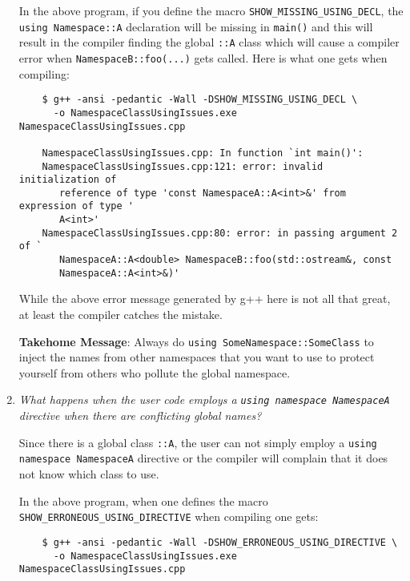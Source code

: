 \begin{enumerate}
In the above program, if you define the macro
{}\texttt{SHOW\-\_MISSING\-\_USING\-\_DECL}, the {}\texttt{using Namespace::A}
declaration will be missing in {}\texttt{main()} and this will result in the
compiler finding the global {}\texttt{::A} class which will cause a compiler
error when {}\texttt{NamespaceB::foo(...)} gets called.  Here is what one gets
when compiling:

{\small\begin{verbatim}
    $ g++ -ansi -pedantic -Wall -DSHOW_MISSING_USING_DECL \
      -o NamespaceClassUsingIssues.exe NamespaceClassUsingIssues.cpp 

    NamespaceClassUsingIssues.cpp: In function `int main()':
    NamespaceClassUsingIssues.cpp:121: error: invalid initialization of 
       reference of type 'const NamespaceA::A<int>&' from expression of type '
       A<int>'
    NamespaceClassUsingIssues.cpp:80: error: in passing argument 2 of `
       NamespaceA::A<double> NamespaceB::foo(std::ostream&, const 
       NamespaceA::A<int>&)'
\end{verbatim}}

While the above error message generated by g++ here is not all that great, at
least the compiler catches the mistake.

{}\textbf{Takehome Message}: Always do {}\texttt{using
SomeNamespace::SomeClass} to inject the names from other namespaces that you
want to use to protect yourself from others who pollute the global namespace.

{}\item\textit{What happens when the user code employs a {}\texttt{using
namespace NamespaceA} directive when there are conflicting global names?}

Since there is a global class {}\texttt{::A}, the user can not simply employ a
{}\texttt{using namespace NamespaceA} directive or the compiler will complain
that it does not know which class to use.

In the above program, when one defines the macro
{}\texttt{SHOW\-\_ERRONEOUS\-\_USING\-\_DIRECTIVE} when compiling one gets:

{\small\begin{verbatim}
    $ g++ -ansi -pedantic -Wall -DSHOW_ERRONEOUS_USING_DIRECTIVE \
      -o NamespaceClassUsingIssues.exe NamespaceClassUsingIssues.cpp 


\end{verbatim}}
\end{enumerate}
